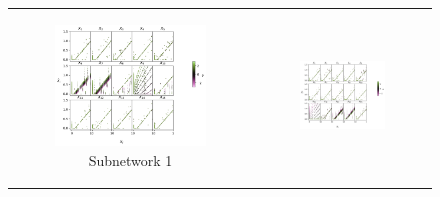\documentclass{article}
\theoremstyle{plain}
\theoremstyle{definition}
\theoremstyle{remark}
\begin{document}
\begin{figure}[ht]
    \centering
    \caption{Effects of intervening on the first 5 subnetworks of the TMS-in-parallel model.}
    \label{fig:s3_tms_interventions}

    \begin{minipage}{\textwidth} %
        \centering
        \begin{tabular}{cc}  %
            \begin{subfigure}{0.3\textwidth}
                \centering
                \includegraphics[width=\linewidth]{../figures/s4_tms_intervention_network1.pdf}
                \caption{Subnetwork 1}
            \end{subfigure} &
            \begin{subfigure}{0.3\textwidth}
                \centering
                \includegraphics[width=\linewidth]{../figures/s4_tms_intervention_network2.pdf}

\end{subfigure}
\end{tabular}
\end{minipage}
\end{figure}
\end{document}
